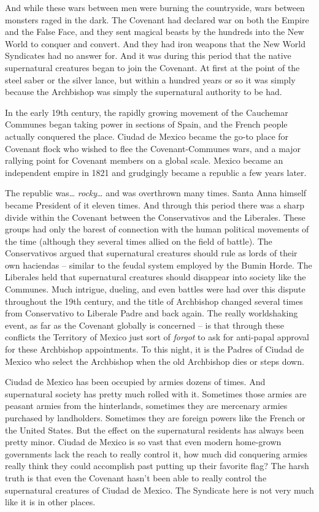 And while these wars between men were burning the countryside, wars between monsters raged in the dark. The Covenant had declared war on both the Empire and the False Face, and they sent magical beasts by the hundreds into the New World to conquer and convert. And they had iron weapons that the New World Syndicates had no answer for. And it was during this period that the native supernatural creatures began to join the Covenant. At first at the point of the steel saber or the silver lance, but within a hundred years or so it was simply because the Archbishop was simply the supernatural authority to be had.

In the early 19th century, the rapidly growing movement of the Cauchemar Communes began taking power in sections of Spain, and the French people actually conquered the place. Ciudad de Mexico became the go-to place for Covenant flock who wished to flee the Covenant-Communes wars, and a major rallying point for Covenant members on a global scale. Mexico became an independent empire in 1821 and grudgingly became a republic a few years later. 

The republic was\ldots{} \textit{rocky}\ldots{} and was overthrown many times. Santa Anna himself became President of it eleven times. And through this period there was a sharp divide within the Covenant between the Conservativos and the Liberales. These groups had only the barest of connection with the human political movements of the time (although they several times allied on the field of battle). The Conservativos argued that supernatural creatures should rule as lords of their own haciendas -- similar to the feudal system employed by the Bumin Horde. The Liberales held that supernatural creatures should disappear into society like the Communes. Much intrigue, dueling, and even battles were had over this dispute throughout the 19th century, and the title of Archbishop changed several times from Conservativo to Liberale Padre and back again. The really worldshaking event, as far as the Covenant globally is concerned -- is that through these conflicts the Territory of Mexico just sort of \textit{forgot} to ask for anti-papal approval for these Archbishop appointments. To this night, it is the Padres of Ciudad de Mexico who select the Archbishop when the old Archbishop dies or steps down.

Ciudad de Mexico has been occupied by armies dozens of times. And supernatural society has pretty much rolled with it. Sometimes those armies are peasant armies from the hinterlands, sometimes they are mercenary armies purchased by landholders. Sometimes they are foreign powers like the French or the United States. But the effect on the supernatural residents has always been pretty minor. Ciudad de Mexico is so vast that even modern home-grown governments lack the reach to really control it, how much did conquering armies really think they could accomplish past putting up their favorite flag? The harsh truth is that even the Covenant hasn't been able to really control the supernatural creatures of Ciudad de Mexico. The Syndicate here is not very much like it is in other places.

